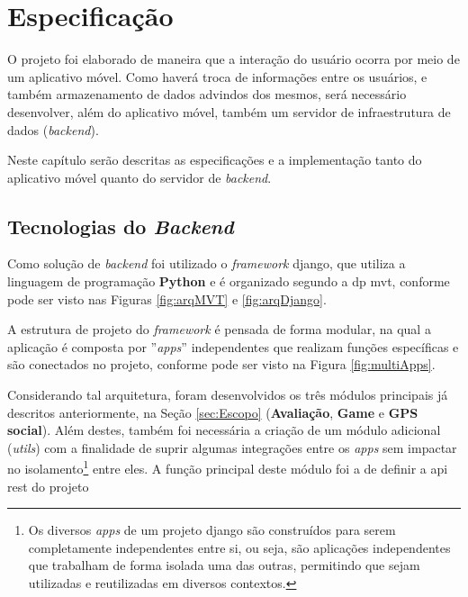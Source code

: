\chapter{Especificação}\label{chp:Especificação}
O projeto foi elaborado de maneira que a interação do usuário ocorra por meio de um aplicativo móvel. Como haverá troca de informações entre os usuários, e também armazenamento de dados advindos dos mesmos, será necessário desenvolver, além do aplicativo móvel, também um servidor de infraestrutura de dados (\textit{backend}).

Neste capítulo serão descritas as especificações e a implementação tanto do aplicativo móvel quanto do servidor de \textit{backend}.

\section{Tecnologias do \textit{Backend}}\label{sec:spec-backend}
Como solução de \textit{backend} foi utilizado o \textit{framework} \gls{django}, que utiliza a linguagem de programação \textbf{Python} e é organizado segundo a \gls{dp} \gls{mvt}, conforme pode ser visto nas Figuras \ref{fig:arqMVT} e \ref{fig:arqDjango}.%
%
%

A estrutura de projeto do \textit{framework} é pensada de forma modular, na qual a aplicação é composta por ''\textit{apps}'' independentes que realizam funções específicas e são conectados no projeto, conforme pode ser visto na Figura \ref{fig:multiApps}.%
%

Considerando tal arquitetura, foram desenvolvidos os três módulos principais já descritos anteriormente, na Seção \ref{sec:Escopo} (\textbf{Avaliação}, \textbf{Game} e \textbf{GPS social}). Além destes, também foi necessária a criação de um módulo adicional (\textit{utils}) com a finalidade de suprir algumas integrações entre os \textit{apps} sem impactar no isolamento\footnote{Os diversos \textit{apps} de um projeto \gls{django} são construídos para serem completamente independentes entre si, ou seja, são aplicações independentes que trabalham de forma isolada uma das outras, permitindo que sejam utilizadas e reutilizadas em diversos contextos.} entre eles. A função principal deste módulo foi a de definir a \gls{api} \gls{rest} do projeto

